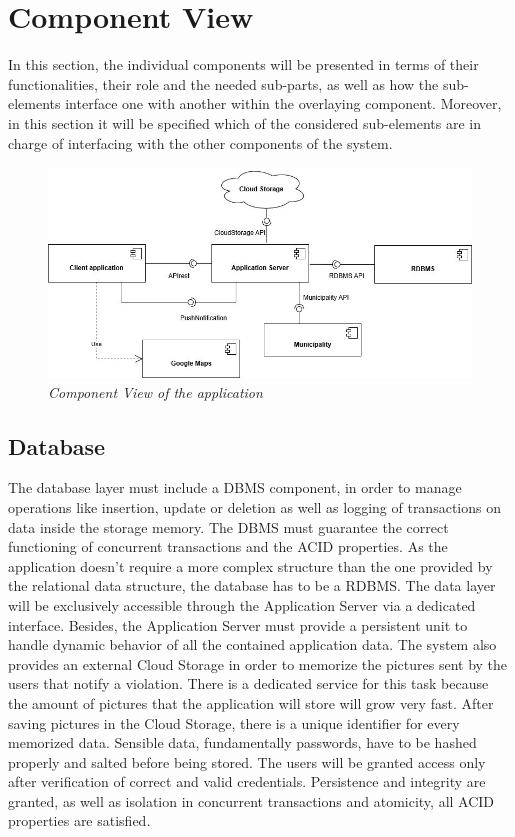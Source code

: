 \section{Component View}
In this section, the individual components will be presented in terms of their functionalities, their role and the 
needed sub-parts, as well as how the sub-elements interface one with another within the overlaying component. Moreover, 
in this section it will be specified which of the considered sub-elements are in charge of interfacing with the other 
components of the system.

\begin{figure}[H]
  \centering
  \includegraphics[origin=c,width=\textwidth]{DD_Images/ComponentView/componentView.jpg}
  \caption{\textit{Component View of the application}}
\end{figure}

\subsection{Database}
The database layer must include a DBMS component, in order to manage operations like insertion, update or deletion as 
well as logging of transactions on data inside the storage memory. The DBMS must guarantee the correct functioning of 
concurrent transactions and the ACID properties. As the application doesn’t require a more complex structure than the 
one provided by the relational data structure, the database has to be a RDBMS. The data layer will be exclusively 
accessible through the Application Server via a dedicated interface. Besides, the Application Server must provide a 
persistent unit to handle dynamic behavior of all the contained application data. 
\newline The system also provides an external Cloud Storage in order to memorize the pictures sent by the users that 
notify a violation. There is a dedicated service for this task because the amount of pictures that the application will
store will grow very fast. After saving pictures in the Cloud Storage, there is a unique identifier for every memorized data.
\newline Sensible data, fundamentally passwords, have to be hashed properly and salted before being stored. 
The users will be granted access only after verification of correct and valid credentials.
\newline Persistence and integrity are granted, as well as isolation in concurrent transactions and atomicity, all ACID properties 
are satisfied.

